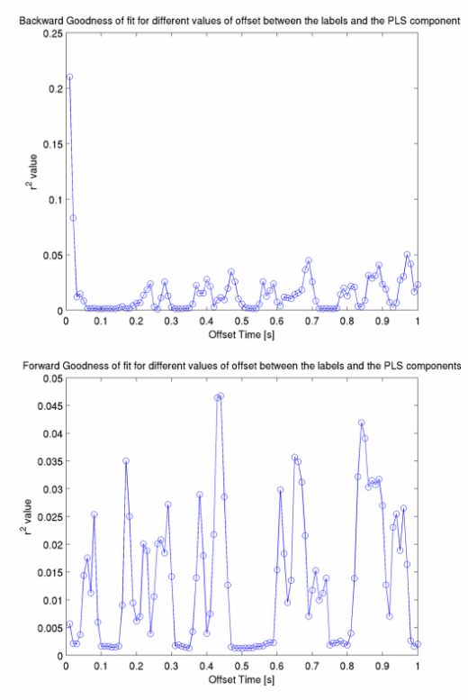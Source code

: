 \documentclass[12pt]{article}
\begin{document}
\includegraphics[scale=0.2]{pls_regression_r_value_forward.png}
\includegraphics[scale=0.2]{pls_regression_r_value_backward.png}
\end{document}
